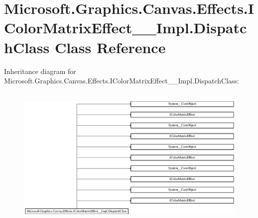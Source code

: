 \hypertarget{class_microsoft_1_1_graphics_1_1_canvas_1_1_effects_1_1_i_color_matrix_effect_____impl_1_1_dispatch_class}{}\section{Microsoft.\+Graphics.\+Canvas.\+Effects.\+I\+Color\+Matrix\+Effect\+\_\+\+\_\+\+Impl.\+Dispatch\+Class Class Reference}
\label{class_microsoft_1_1_graphics_1_1_canvas_1_1_effects_1_1_i_color_matrix_effect_____impl_1_1_dispatch_class}
Inheritance diagram for Microsoft.\+Graphics.\+Canvas.\+Effects.\+I\+Color\+Matrix\+Effect\+\_\+\+\_\+\+Impl.\+Dispatch\+Class\+:\begin{figure}[H]
\begin{center}
\leavevmode
\includegraphics[height=6.936937cm]{class_microsoft_1_1_graphics_1_1_canvas_1_1_effects_1_1_i_color_matrix_effect_____impl_1_1_dispatch_class}
\end{center}
\end{figure}
